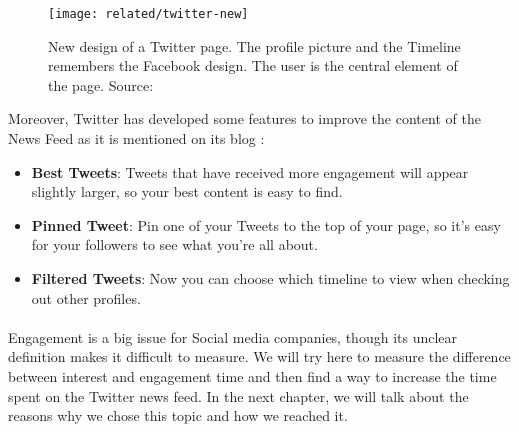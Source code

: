 \begin{figure}[h]
\centering 
\texttt{[image: related/twitter-new]} 
\caption[Twitter new design]{New design of a Twitter page. The profile picture and the Timeline remembers the Facebook design. The user is the central element of the page. Source: \cite{t_new_vs_old}}
\label{fig:twitter-new}
\end{figure}

Moreover, Twitter has developed some features to improve the content of the News Feed as it is mentioned on its blog \cite{t_new_design}:

\begin{itemize}
  \item \textbf{Best Tweets}: Tweets that have received more engagement will appear slightly larger, so your best content is easy to find.
  \item \textbf{Pinned Tweet}: Pin one of your Tweets to the top of your page, so it's easy for your followers to see what you're all about.
  \item \textbf{Filtered Tweets}: Now you can choose which timeline to view when checking out other profiles.
\end{itemize}

\paragraph{}
Engagement is a big issue for Social media companies, though its unclear definition makes it difficult to measure. We will try here to measure the difference between interest and engagement time and then find a way to increase the time spent on the Twitter news feed. In the next chapter, we will talk about the reasons why we chose this topic and how we reached it.
